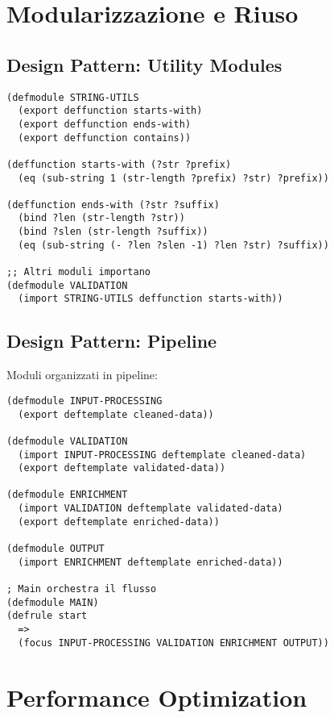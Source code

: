 \section{Modularizzazione e Riuso}

\subsection{Design Pattern: Utility Modules}

\begin{lstlisting}[language=CLIPS]
(defmodule STRING-UTILS
  (export deffunction starts-with)
  (export deffunction ends-with)
  (export deffunction contains))

(deffunction starts-with (?str ?prefix)
  (eq (sub-string 1 (str-length ?prefix) ?str) ?prefix))

(deffunction ends-with (?str ?suffix)
  (bind ?len (str-length ?str))
  (bind ?slen (str-length ?suffix))
  (eq (sub-string (- ?len ?slen -1) ?len ?str) ?suffix))

;; Altri moduli importano
(defmodule VALIDATION
  (import STRING-UTILS deffunction starts-with))
\end{lstlisting}

\subsection{Design Pattern: Pipeline}

Moduli organizzati in pipeline:

\begin{lstlisting}[language=CLIPS]
(defmodule INPUT-PROCESSING
  (export deftemplate cleaned-data))

(defmodule VALIDATION
  (import INPUT-PROCESSING deftemplate cleaned-data)
  (export deftemplate validated-data))

(defmodule ENRICHMENT
  (import VALIDATION deftemplate validated-data)
  (export deftemplate enriched-data))

(defmodule OUTPUT
  (import ENRICHMENT deftemplate enriched-data))

; Main orchestra il flusso
(defmodule MAIN)
(defrule start
  =>
  (focus INPUT-PROCESSING VALIDATION ENRICHMENT OUTPUT))
\end{lstlisting}

\section{Performance Optimization}


